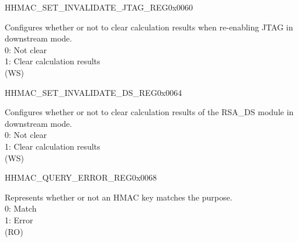     \begin{register}{H}{HMAC\_SET\_INVALIDATE\_JTAG\_REG}{0x0060}\label{regdesc:HMACSETINVALIDATEJTAGREG}
    \regnewline%
    \begin{regdesc}\begin{reglist}
    \label{fielddesc:HMACSETINVALIDATEJTAG}\item [HMAC\_SET\_INVALIDATE\_JTAG] Configures whether or not to clear calculation results when re-enabling JTAG in downstream mode.
    \\0: Not clear
    \\1: Clear calculation results
    \\(WS)
    \end{reglist}\end{regdesc}
    \end{register}


    \begin{register}{H}{HMAC\_SET\_INVALIDATE\_DS\_REG}{0x0064}\label{regdesc:HMACSETINVALIDATEDSREG}
    \regnewline%
    \begin{regdesc}\begin{reglist}
    \label{fielddesc:HMACSETINVALIDATEDS}\item [HMAC\_SET\_INVALIDATE\_DS] Configures whether or not to clear calculation results of the RSA\_DS module in downstream mode.
    \\0: Not clear
    \\1: Clear calculation results
    \\(WS)
    \end{reglist}\end{regdesc}
    \end{register}


    \begin{register}{H}{HMAC\_QUERY\_ERROR\_REG}{0x0068}\label{regdesc:HMACQUERYERRORREG}
    \regnewline%
    \begin{regdesc}\begin{reglist}
    \label{fielddesc:HMACQUREYCHECK}\item [HMAC\_QUREY\_CHECK] Represents whether or not an HMAC key matches the purpose.
    \\0: Match
    \\1: Error
    \\(RO)
    \end{reglist}\end{regdesc}
    \end{register}


